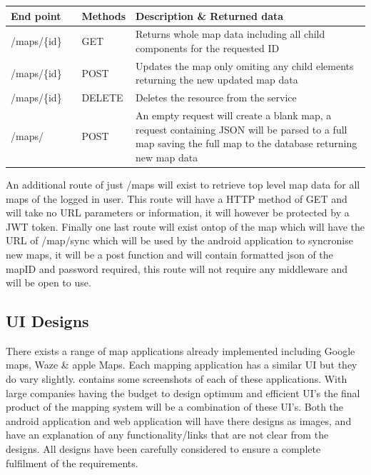 \begin{longtable}{| p{0.2\linewidth} | p{0.1\linewidth} | p{0.7\linewidth}|}
	\hline
	End point & Methods & Description \& Returned data\\\hline
	/maps/\{id\} & GET & Returns whole map data including all child components for the requested ID\\\hline
	/maps/\{id\} & POST & Updates the map only omiting any child elements  returning the new updated map data\\\hline
	/maps/\{id\} & DELETE & Deletes the resource from the service\\\hline
	/maps/ & POST & An empty request will create a blank map, a request containing JSON will be parsed to a full map saving the full map to the database returning new map data\\\hline
	
\end{longtable}

An additional route of just /maps will exist to retrieve top level map data for all maps of the logged in user. This route will have a HTTP method of GET and will take no URL parameters or information, it will however be protected by a JWT token.
Finally one last route will exist ontop of the map which will have the URL of /map/sync which will be used by the android application to syncronise new maps, it will be a post function and will contain formatted json of the mapID and password required, this route will not require any middleware and will be open to use.

\subsection{UI Designs}
There exists a range of map applications already implemented including Google maps, Waze \& apple Maps. Each mapping application has a similar UI but they do vary slightly. \appendixtemp contains some screenshots of each of these applications. With large companies having the budget to design optimum and efficient UI's the final product of the mapping system will be a combination of these UI's. Both the android application and web application will have there designs as images, and have an explanation of any functionality/links that are not clear from the designs. All designs have been carefully considered to ensure a complete fulfilment of the requirements.

\pagebreak
